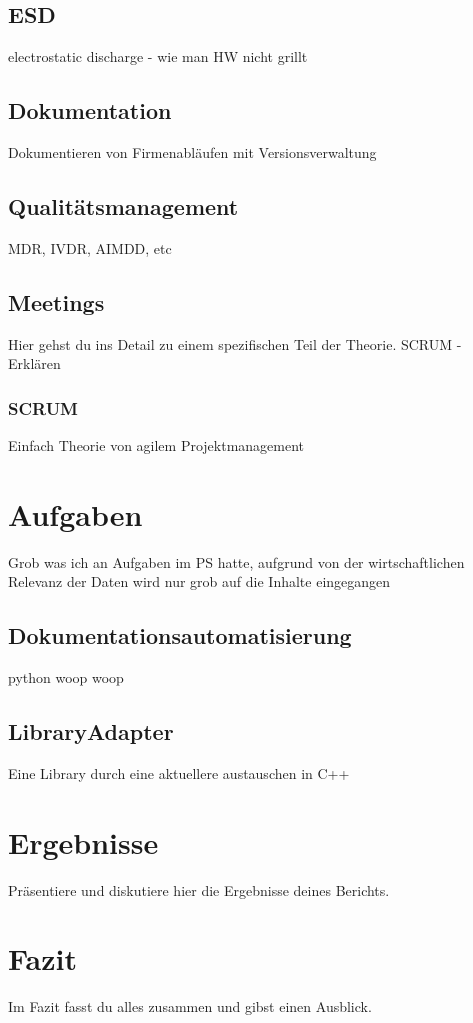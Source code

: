 \documentclass[a4paper, 12pt]{article}
\begin{document}
\subsection{ESD}\label{ESD}

electrostatic discharge - wie man HW nicht grillt
\subsection{Dokumentation}\label{Dokumentation}
Dokumentieren von Firmenabläufen mit Versionsverwaltung

\subsection{Qualitätsmanagement}\label{Qualitätsmanagement}
MDR, IVDR, AIMDD, etc


\subsection{Meetings}\label{Meetings}
Hier gehst du ins Detail zu einem spezifischen Teil der Theorie.
SCRUM - Erklären

\subsubsection{SCRUM}\label{SCRUM}
Einfach Theorie von agilem Projektmanagement

\newpage
\section{Aufgaben}\label{Aufgaben}
Grob was ich an Aufgaben im PS hatte, aufgrund von der wirtschaftlichen Relevanz der Daten wird nur grob auf die Inhalte eingegangen

\subsection{Dokumentationsautomatisierung}\label{Dokumentationsautomatisierung}
python woop woop

\subsection{LibraryAdapter}\label{LibraryAdapter}
Eine Library durch eine aktuellere austauschen in C++

\newpage
\section{Ergebnisse}
Präsentiere und diskutiere hier die Ergebnisse deines Berichts.

\newpage
\section{Fazit}
Im Fazit fasst du alles zusammen und gibst einen Ausblick.

\newpage

\end{document}
